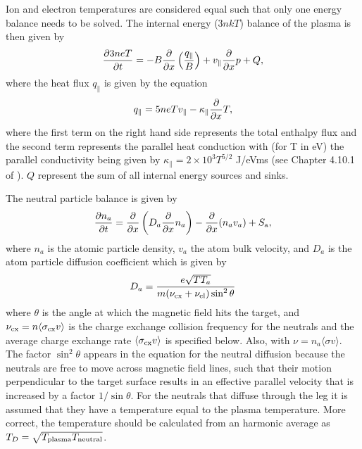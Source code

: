 \documentclass[amsmath,amssymb,a4]{revtex4-2}
\begin{document}
\noindent Ion and electron temperatures are considered equal such that only one energy balance needs to be solved. The internal energy ($3 n k T$) balance of the plasma is then given by
\begin{equation}\label{energy_balance}
    {\partial 3 n e T \over \partial t} = - B{\partial \over \partial x} \left({q_\parallel \over B}\right) + v_\parallel {\partial \over \partial x} p + Q,
\end{equation}
where the heat flux $q_\parallel$ is given by the equation
\begin{equation}\label{heat_flux}
    q_\parallel = 5 n e T v_\parallel - \kappa_\parallel {\partial \over \partial x} T,
\end{equation}
where the first term on the right hand side represents the total enthalpy flux and the second term represents the parallel heat conduction with (for T in eV) the parallel conductivity being given by $\kappa_\parallel = 2 \times 10^3 T^{5/2}$ J/eVms (see Chapter 4.10.1 of \cite{stangeby}). $Q$ represent the sum of all internal energy sources and sinks.

\noindent The neutral particle balance is given by
\begin{equation}\label{eq:neutral density}
    {\partial n_a \over \partial t} = {\partial \over \partial x} \left( D_a {\partial \over \partial x} n_a \right)- {\partial \over \partial x}(n_a v_a) + S_{\rm a},%
\end{equation}
where $n_a$ is the atomic particle density, $v_a$ the atom bulk velocity, and $D_a$ is the atom particle diffusion coefficient which is given by \cite{nakazawa2000}
\begin{equation}\label{neutral_diffusion_coefficient}
    D_a = { e\sqrt{TT_a} \over m (\nu_{\rm cx}+\nu_{\rm el}) \sin^2\theta }
\end{equation}
where $\theta$ is the angle at which the magnetic field hits the target, and $\nu_{\rm cx} = n \langle\sigma_{\rm cx} v\rangle$ is the charge exchange collision frequency for the neutrals and the average charge exchange rate $\langle\sigma_{\rm cx} v\rangle$ is specified below. Also, with $\nu=n_a\langle\sigma v\rangle$. The factor $\sin^2\theta$ appears in the equation for the neutral diffusion because the neutrals are free to move across magnetic field lines, such that their motion perpendicular to the target surface results in an effective parallel velocity that is increased by a factor $1/\sin\theta$. For the neutrals that diffuse through the leg it is assumed that they have a temperature equal to the plasma temperature. More correct, the temperature should be calculated from an harmonic average as $T_{D}=\sqrt{T_{\rm plasma} T_{\rm neutral}}$. 
\end{document}
